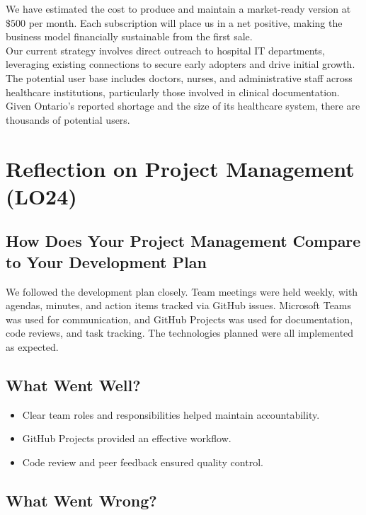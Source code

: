 \documentclass{article}
\begin{document}
 
 \noindent
 We have estimated the cost to produce and maintain a market-ready version at $\$500$ per month. Each subscription will place us in a net positive, making the business model financially sustainable from the first sale. \\
 
 \noindent
 Our current strategy involves direct outreach to hospital IT departments, leveraging existing connections to secure early adopters and drive initial growth. The potential user base includes doctors, nurses, and administrative staff across healthcare institutions, particularly those involved in clinical documentation. Given Ontario’s reported shortage and the size of its healthcare system, there are thousands of potential users.
 
 \section{Reflection on Project Management (LO24)}
 
 \subsection{How Does Your Project Management Compare to Your Development Plan}
 
 We followed the development plan closely. Team meetings were held weekly, with agendas, minutes, and action items tracked via GitHub issues. Microsoft Teams was used for communication, and GitHub Projects was used for documentation, code reviews, and task tracking. The technologies planned were all implemented as expected.
 
 \subsection{What Went Well?}
 
 \begin{itemize}
     \item Clear team roles and responsibilities helped maintain accountability.
     \item GitHub Projects provided an effective workflow.
     \item Code review and peer feedback ensured quality control.
 \end{itemize}
 
 \subsection{What Went Wrong?}
 
\end{document}
